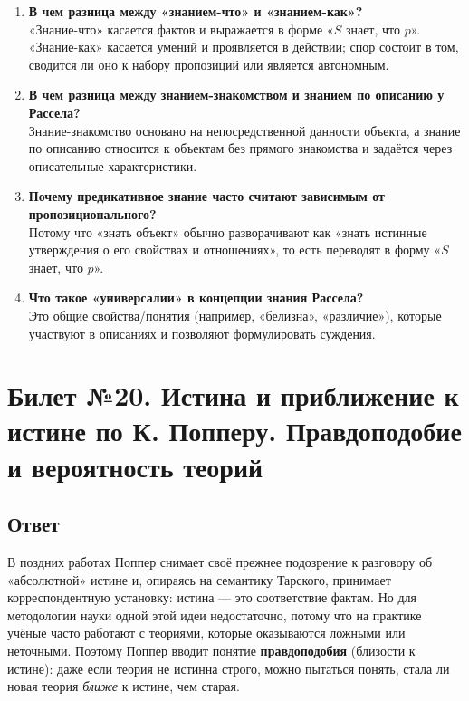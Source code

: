 \documentclass[a4paper,12pt]{article}
\begin{document}
\begin{enumerate}
    \item \textbf{В чем разница между «знанием-что» и «знанием-как»?}\\
    «Знание-что» касается фактов и выражается в форме «$S$ знает, что $p$». «Знание-как» касается умений и проявляется в действии; спор состоит в том, сводится ли оно к набору пропозиций или является автономным.
    \item \textbf{В чем разница между знанием-знакомством и знанием по описанию у Рассела?}\\
    Знание-знакомство основано на непосредственной данности объекта, а знание по описанию относится к объектам без прямого знакомства и задаётся через описательные характеристики.
    \item \textbf{Почему предикативное знание часто считают зависимым от пропозиционального?}\\
    Потому что «знать объект» обычно разворачивают как «знать истинные утверждения о его свойствах и отношениях», то есть переводят в форму «$S$ знает, что $p$».
    \item \textbf{Что такое «универсалии» в концепции знания Рассела?}\\
    Это общие свойства/понятия (например, «белизна», «различие»), которые участвуют в описаниях и позволяют формулировать суждения.
\end{enumerate}


\newpage
\section{Билет №20. Истина и приближение к истине по К. Попперу. Правдоподобие и вероятность теорий}

\subsection{Ответ}

В поздних работах Поппер снимает своё прежнее подозрение к разговору об «абсолютной» истине и, опираясь на семантику Тарского, принимает корреспондентную установку: истина --- это соответствие фактам. Но для методологии науки одной этой идеи недостаточно, потому что на практике учёные часто работают с теориями, которые оказываются ложными или неточными. Поэтому Поппер вводит понятие \textbf{правдоподобия} (близости к истине): даже если теория не истинна строго, можно пытаться понять, стала ли новая теория \emph{ближе} к истине, чем старая.
\end{document}
